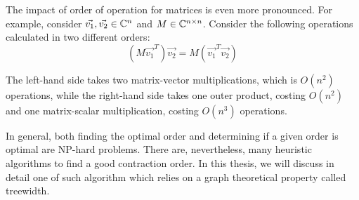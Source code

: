 The impact of order of operation for matrices is even more pronounced.
For example, consider $\vec{v_1}, \vec{v_2} \in \mathbb{C}^n $ and $M \in \mathbb{C}^{n \times n}$. 
Consider the following operations calculated in two different orders:
$$
(M\vec{v_1}^T ) \vec{v_2} = M(\vec{v_1}^T \vec{v_2})
$$

The left-hand side takes two matrix-vector multiplications, which is $O(n^2)$ operations, while the right-hand side takes one outer product, costing $O(n^2)$ and one matrix-scalar multiplication, costing $O(n^3)$ operations.

In general, both finding the optimal order and determining if a given order is optimal are NP-hard problems.
There are, nevertheless, many heuristic algorithms to find a good contraction order.
In this thesis, we will discuss in detail one of such algorithm which relies on a graph theoretical property called treewidth.


